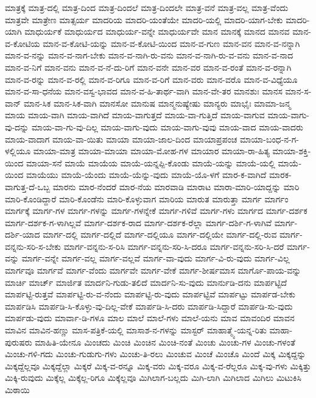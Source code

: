 ಮಾತ್ರಕ್ಕೆ
ಮಾತ್ರ-ದಲ್ಲಿ
ಮಾತ್ರ-ದಿಂದ
ಮಾತ್ರ-ದಿಂದಲೆ
ಮಾತ್ರ-ದಿಂದಲೇ
ಮಾತ್ರ-ವನೆ
ಮಾತ್ರ-ವಲ್ಲ
ಮಾತ್ರ-ವೆಂದು
ಮಾತ್ರವೇ
ಮಾತ್ರೇಣ
ಮಾತ್ಸರ್ಯ
ಮಾದರಿಯ
ಮಾದರಿ-ಯಂತೆಯೇ
ಮಾದರಿ-ಯಲ್ಲಿ
ಮಾದರಿ-ಯಾಗ-ಬೇಕು
ಮಾದರಿ-ಯಾಗಿ
ಮಾಧುರ್ಯಕೆ
ಮಾಧುರ್ಯದ
ಮಾಧುರ್ಯ-ವನ್ನೇ
ಮಾಧುರ್ಯವೇ
ಮಾನ
ಮಾನಕ್ಕೆ
ಮಾನದ
ಮಾನವ
ಮಾನ-ವ-ಕೋಟಿಯ
ಮಾನ-ವ-ಕೋಟಿ-ಯನ್ನು
ಮಾನ-ವ-ಕೋಟಿ-ಯಿಂದ
ಮಾನ-ವ-ಗುಣ
ಮಾನ-ವನ
ಮಾನ-ವ-ನನ್ನಾಗಿ
ಮಾನ-ವ-ನನ್ನು
ಮಾನ-ವ-ನಾಗ-ಬೇಕು
ಮಾನ-ವ-ನಾಗಿ-ರು-ವನು
ಮಾನ-ವ-ನಾಗಿ-ರು-ವ-ವನು
ಮಾನ-ವ-ನಾದ
ಮಾನ-ವ-ನಿಗೆ
ಮಾನ-ವನು
ಮಾನ-ವ-ನೆ-ದು-ರಿಗೆ
ಮಾನ-ವನೇ
ಮಾನ-ವರ
ಮಾನ-ವ-ರಂತೆ
ಮಾನ-ವ-ರನ್ನಾಗಿ
ಮಾನ-ವ-ರನ್ನು
ಮಾನ-ವ-ರಲ್ಲಿ
ಮಾನ-ವ-ರಿಗೂ
ಮಾನ-ವ-ರಿಗೆ
ಮಾನ-ವರು
ಮಾನ-ವರೊ
ಮಾನ-ವ-ವಿಧ್ಯೆಯೂ
ಮಾನ-ವ-ಸಾ-ಧನೆಯ
ಮಾನ-ವಸ್ವ-ಭಾವದ
ಮಾನ-ವ-ಹಿ-ತಾರ್ಥ-ವಾಗಿ
ಮಾನ-ವೇ-ತರ
ಮಾನಶುಃ
ಮಾನಸ
ಮಾನ-ಸ-ವಾನ್
ಮಾನ-ಸಿಕ
ಮಾನ-ಸಿಕ-ವಾಗಿ
ಮಾನಸೋ
ಮಾನುಷ
ಮಾನ್ಮನುಷ್ಯೇಷು
ಮಾನ್ಯರು
ಮಾಭೈಃ
ಮಾಮಾ-ಜನ್ಮ
ಮಾಯ
ಮಾಯ-ವಾಗಿ
ಮಾಯ-ವಾಗಿದೆ
ಮಾಯ-ವಾಗುತ್ತದೆ
ಮಾಯ-ವಾ-ಗುತ್ತಿದೆ
ಮಾಯ-ವಾಗುವ
ಮಾಯ-ವಾಗು-ವು-ದನ್ನು
ಮಾಯ-ವಾ-ಗು-ವು-ದಿಲ್ಲ
ಮಾಯ-ವಾಗು-ವುದು
ಮಾಯ-ವಾಗು-ವುವು
ಮಾಯ-ವಾದ
ಮಾಯ-ವಾದರು
ಮಾಯ-ವಾದಾಗ
ಮಾಯ-ವಾ-ಯಿತು
ಮಾಯಾ
ಮಾಯಾ-ಜಾಲ-ದಿಂದ
ಮಾಯಾಪ್ರಪಂಚ
ಮಾಯಾ-ಬಂಧ-ನ-ಗ-ಳಲ್ಲಿಯೂ
ಮಾಯಾ-ಮಾತ್ರ
ಮಾಯಾ-ಮಾಯಾ
ಮಾಯಾ-ಮೋಹ-ಗಳ
ಮಾಯಾರ
ಮಾಯಾ-ರಾ-ಹಿತ್ಯ
ಮಾಯಾ-ಶಕ್ತಿ-ಯಿಂದ
ಮಾಯಾ-ಸನೆ
ಮಾಯೆ
ಮಾಯೆಯ
ಮಾಯೆ-ಯನ್ನಪ್ಪಿ-ಕೊಂಡು
ಮಾಯೆ-ಯನ್ನು
ಮಾಯೆ-ಯಲ್ಲಿ
ಮಾಯೆ-ಯಿಂದ
ಮಾಯೆಯು
ಮಾಯೆ-ಯೆಂದು
ಮಾಯೆ-ಯೆನ್ನು-ವುದು
ಮಾಯೆ-ಯೊ-ಳಗೆ
ಮಾರ-ಕ-ವಾಗಿದೆ
ಮಾರಕ-ವಾಗುತ್ತ-ದೆ-ಒಬ್ಬ
ಮಾರನು
ಮಾರ-ನೆಂದರೆ
ಮಾರ-ನೆಯ
ಮಾರವಾಡಿ
ಮಾರಾಟ
ಮಾರಾ-ಮಾರಿ-ಯಾದ್ದನ್ನು
ಮಾರಿ
ಮಾರಿ-ಕೊಂಡಿದ್ದಾರೆ
ಮಾರಿ-ಕೊಂಡೆನು
ಮಾರಿ-ಕೊಳ್ಳುವಾಗ
ಮಾರಿಯ
ಮಾರುತ
ಮಾರುತ್ತಾ
ಮಾರ್ಗ
ಮಾರ್ಗಂ
ಮಾರ್ಗಕ್ಕೆ
ಮಾರ್ಗ-ಗಳ
ಮಾರ್ಗ-ಗಳನ್ನು
ಮಾರ್ಗ-ಗಳನ್ನೇಕೆ
ಮಾರ್ಗ-ಗಳಿವೆ
ಮಾರ್ಗ-ಗಳು
ಮಾರ್ಗದ
ಮಾರ್ಗ-ದರ್ಶಕ
ಮಾರ್ಗ-ದರ್ಶಕ-ಗ-ಳಾಗಿಲ್ಲವೆ
ಮಾರ್ಗ-ದರ್ಶಕ-ರಾದ
ಮಾರ್ಗ-ದರ್ಶಕ-ರೆಲ್ಲಾ
ಮಾರ್ಗ-ದರ್ಶಿ-ಗ-ಳಾಗಿವೆ
ಮಾರ್ಗ-ದರ್ಶಿ-ಯಾದ
ಮಾರ್ಗ-ದಲ್ಲಿ
ಮಾರ್ಗ-ದಲ್ಲಿದೆ
ಮಾರ್ಗ-ದಲ್ಲಿಯೂ
ಮಾರ್ಗ-ದಲ್ಲಿಯೇ
ಮಾರ್ಗ-ದಲ್ಲಿ-ರುವ
ಮಾರ್ಗ-ವನ್ನನು-ಸರಿ-ಸ-ಬೇಕು
ಮಾರ್ಗ-ವನ್ನನು-ಸ-ರಿಸಿ
ಮಾರ್ಗ-ವನ್ನನು-ಸರಿ-ಸಿ-ದರೂ
ಮಾರ್ಗ-ವನ್ನನು-ಸರಿ-ಸಿ-ದರೆ
ಮಾರ್ಗ-ವನ್ನು
ಮಾರ್ಗ-ವನ್ನೇ
ಮಾರ್ಗ-ವಲ್ಲ
ಮಾರ್ಗ-ವಲ್ಲವೆ
ಮಾರ್ಗ-ವಾ-ವುದು
ಮಾರ್ಗ-ವಿ-ರು-ವುದು
ಮಾರ್ಗ-ವಿಲ್ಲ
ಮಾರ್ಗವೂ
ಮಾರ್ಗವೆ
ಮಾರ್ಗ-ವೆಂದು
ಮಾರ್ಗವೇ
ಮಾರ್ಗ-ವೇಕೆ
ಮಾರ್ಗ-ಶೀರ್ಷಮಾಸ
ಮಾರ್ಗೊ-ಪಾಯ-ವನ್ನು
ಮಾರ್ಚಿ
ಮಾರ್ಚ್
ಮಾರ್ಜಿತ
ಮಾರ್ದನಿ-ಗುಡು-ತಲಿದೆ
ಮಾರ್ದನಿ-ಸು-ವುದು
ಮಾರ್ನುಡಿ-ದನು
ಮಾರ್ಪಟ್ಟಿದೆ
ಮಾರ್ಪಟ್ಟಿ-ರುತ್ತವೆ
ಮಾರ್ಪಟ್ಟಿ-ರು-ವ-ನೆಂದು
ಮಾರ್ಪಟ್ಟಿ-ರು-ವುದು
ಮಾರ್ಪಟ್ಟಿವೆ
ಮಾರ್ಪಟ್ಟು
ಮಾರ್ಪಡ-ಬೇಕು
ಮಾರ್ಪಡಿಸಿ
ಮಾರ್ಪಡಿ-ಸಿ-ಕೊಳ್ಳು-ವು-ದಿಲ್ಲ-ವೇಕೆ
ಮಾರ್ಪಡಿ-ಸಿ-ದರು
ಮಾರ್ಪಡಿ-ಸಿದ್ದಾರೆ
ಮಾರ್ಪಡಿ-ಸು-ವುದು
ಮಾರ್ಪಡು-ವುದು
ಮಾರ್ವಾ-ಡಿ-ಗಳೂ
ಮಾಲ
ಮಾಲೆ
ಮಾಲೆ-ಗಳು
ಮಾಲೆ-ಯನು
ಮಾವ
ಮಾವಂದಿರ
ಮಾವನ
ಮಾವಿನ
ಮಾವಿನ-ಹಣ್ಣು
ಮಾಸ-ಪತ್ರಿಕೆ-ಯಲ್ಲಿ
ಮಾಸಾಶ-ನ-ಗಳನ್ನು
ಮಾಸ್ಟರ್
ಮಾಹಾತ್ಮ್ಯೆ-ಯನ್ನ-ರಿತು
ಮಾಹಾ-ಪುರುಷರು
ಮಾಹಿತಿ-ಯೇನೂ
ಮಿಂಚದು
ಮಿಂಚಿ
ಮಿಂಚಿನ
ಮಿಂಚಿ-ನಂತೆ
ಮಿಂಚು
ಮಿಂಚು-ಗಳ
ಮಿಂಚು-ಗಳಂತೆ
ಮಿಂಚು-ಗಳಿ-ಗದು
ಮಿಂಚು-ಗುಡುಗು-ಗಳು
ಮಿಂಚು-ತಿ-ರಲು
ಮಿಂಚುವ
ಮಿಂಚೆ
ಮಿಂಚೊ
ಮಿಂದೆ
ಮಿಕ್ಕ
ಮಿಕ್ಕದ್ದನ್ನು
ಮಿಕ್ಕದ್ದೆಲ್ಲವೂ
ಮಿಕ್ಕದ್ದೆಲ್ಲಾ
ಮಿಕ್ಕರೆ
ಮಿಕ್ಕ-ವ-ರನ್ನೂ
ಮಿಕ್ಕ-ವರು
ಮಿಕ್ಕ-ವರೂ
ಮಿಕ್ಕ-ವ-ರೆಲ್ಲರೂ
ಮಿಕ್ಕ-ವು-ಗಳು
ಮಿಕ್ಕಿತ್ತು
ಮಿಕ್ಕಿ-ರುವುದು
ಮಿಕ್ಕೆಲ್ಲ
ಮಿಕ್ಕೆಲ್ಲ-ರಿಗೂ
ಮಿಕ್ಕೆಲ್ಲವೂ
ಮಿಗಿಲಾಗ-ಬಲ್ಲದು
ಮಿಗಿ-ಲಾಗಿ
ಮಿಗಿಲಾದ
ಮಿಗಿಲು
ಮಿಟುಕಿಸಿ
ಮಿಠಾಯಿ
